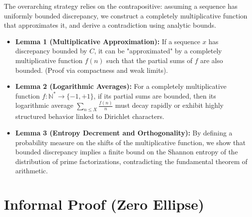 \documentclass[11pt,a4paper]{article}
\begin{document}
The overarching strategy relies on the contrapositive: assuming a sequence has uniformly bounded discrepancy, we construct a completely multiplicative function that approximates it, and derive a contradiction using analytic bounds.

\begin{itemize}
    \item \textbf{Lemma 1 (Multiplicative Approximation):} If a sequence $x$ has discrepancy bounded by $C$, it can be "approximated" by a completely multiplicative function $f(n)$ such that the partial sums of $f$ are also bounded. (Proof via compactness and weak limits).
    \item \textbf{Lemma 2 (Logarithmic Averages):} For a completely multiplicative function $f : \mathbb{N}^* \to \{-1, +1\}$, if its partial sums are bounded, then its logarithmic average $\sum_{n \le X} \frac{f(n)}{n}$ must decay rapidly or exhibit highly structured behavior linked to Dirichlet characters.
    \item \textbf{Lemma 3 (Entropy Decrement and Orthogonality):} By defining a probability measure on the shifts of the multiplicative function, we show that bounded discrepancy implies a finite bound on the Shannon entropy of the distribution of prime factorizations, contradicting the fundamental theorem of arithmetic.
\end{itemize}

\section{Informal Proof (Zero Ellipse)}
\end{document}

